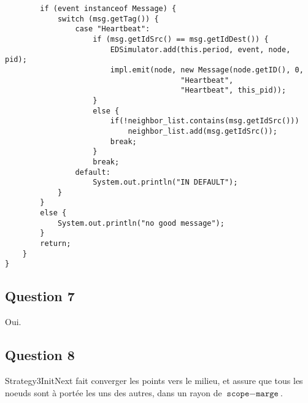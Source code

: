 \documentclass[a4paper]{article}
\begin{document}
\begin{verbatim}
        if (event instanceof Message) {
            switch (msg.getTag()) {
                case "Heartbeat":
                    if (msg.getIdSrc() == msg.getIdDest()) {
                        EDSimulator.add(this.period, event, node, pid);
                        impl.emit(node, new Message(node.getID(), 0,
                                        "Heartbeat",
                                        "Heartbeat", this_pid));
                    }
                    else {
                        if(!neighbor_list.contains(msg.getIdSrc()))
                            neighbor_list.add(msg.getIdSrc());
                        break;
                    }
                    break;
                default:
                    System.out.println("IN DEFAULT");
            }
        }
        else {
            System.out.println("no good message");
        }
        return;
    }
}
\end{verbatim}

\subsection{Question 7}
Oui.

\subsection{Question 8}

Strategy3InitNext fait converger les points vers le milieu, et assure que tous
les noeuds sont à portée les uns des autres, dans un rayon de $ \texttt{scope} -
\texttt{marge} $.
\end{document}

